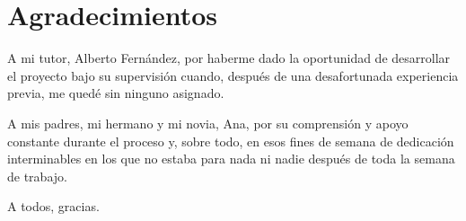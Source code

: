 \chapter{Agradecimientos}

A mi tutor, Alberto Fernández, por haberme dado la oportunidad de desarrollar el proyecto bajo su supervisión cuando, después de una desafortunada experiencia previa, me quedé sin ninguno asignado.

A mis padres, mi hermano y mi novia, Ana, por su comprensión y apoyo constante durante el proceso y, sobre todo, en esos fines de semana de dedicación interminables en los que no estaba para nada ni nadie después de toda la semana de trabajo.

A todos, gracias.